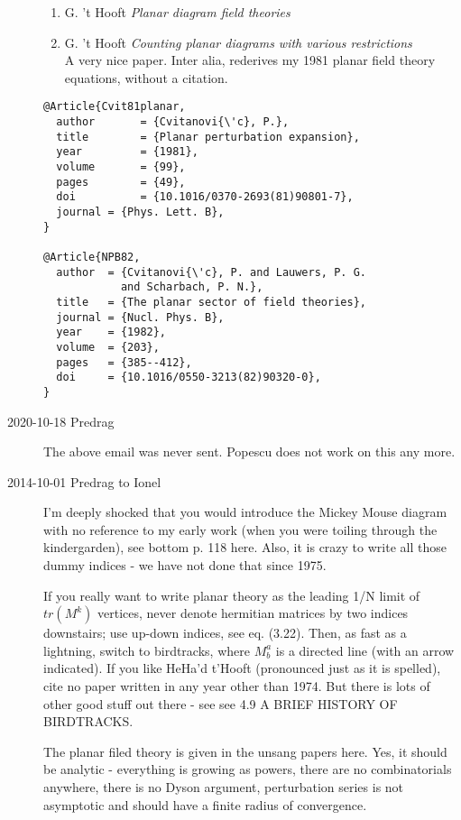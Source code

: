 \begin{description}
\begin{enumerate}
  \item
 G. 't Hooft
{{\em Planar diagram field theories}}

  \item
 G. 't Hooft
 {\emph{Counting planar diagrams with various restrictions}}\\
A very nice paper. Inter alia, rederives my 1981 planar field theory
 equations, without a citation.
\end{enumerate}

\begin{verbatim}
@Article{Cvit81planar,
  author       = {Cvitanovi{\'c}, P.},
  title        = {Planar perturbation expansion},
  year         = {1981},
  volume       = {99},
  pages        = {49},
  doi          = {10.1016/0370-2693(81)90801-7},
  journal = {Phys. Lett. B},
}

@Article{NPB82,
  author  = {Cvitanovi{\'c}, P. and Lauwers, P. G.
            and Scharbach, P. N.},
  title   = {The planar sector of field theories},
  journal = {Nucl. Phys. B},
  year    = {1982},
  volume  = {203},
  pages   = {385--412},
  doi     = {10.1016/0550-3213(82)90320-0},
}
\end{verbatim}

\item[2020-10-18 Predrag]
The above email was never sent. Popescu does not work on this any more.

\item[2014-10-01 Predrag to Ionel]
I'm deeply shocked that you would introduce the Mickey Mouse diagram with
no reference to my early work (when you were toiling through the
kindergarden), see bottom p. 118
{here}. Also, it is crazy to write all
those dummy indices - we have not done that  since 1975.

If you really want to write planar theory as the leading 1/N limit of
$tr(M^k)$ vertices, never denote hermitian matrices by two indices
downstairs; use up-down indices, see eq. (3.22). Then, as fast as a
lightning, switch to birdtracks, where $M^a_b$ is a directed line (with
an arrow indicated). If you like HeHa'd t'Hooft (pronounced just as it is
spelled), cite no paper written in any year other than 1974. But there is
lots of other good stuff out there - see see 4.9 A BRIEF HISTORY OF
BIRDTRACKS.

The planar filed theory is given in the unsang papers here. Yes, it
should be analytic - everything is growing as powers, there are no
combinatorials anywhere, there is no Dyson argument, perturbation series
is not asymptotic and should have a finite radius of convergence.


\end{description}
